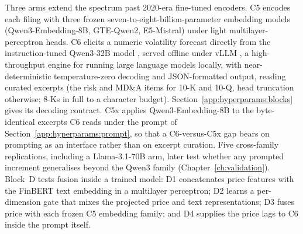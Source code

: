 Three arms extend the spectrum past 2020-era fine-tuned encoders. C5 encodes each filing with three frozen seven-to-eight-billion-parameter embedding models (Qwen3-Embedding-8B, GTE-Qwen2, E5-Mistral) under light multilayer-perceptron heads. %
C6 elicits a numeric volatility forecast directly from the instruction-tuned Qwen3-32B model \cite{qwen3_2025}, served offline under vLLM \cite{kwon2023vllm}, a high-throughput engine for running large language models locally, with near-deterministic temperature-zero decoding and JSON-formatted output, reading curated excerpts (the risk and MD\&A items for 10-K and 10-Q, head truncation otherwise; 8-Ks in full to a character budget). Section~\ref{app:hyperparams:blocks} gives its decoding contract. %
C5x applies Qwen3-Embedding-8B to the byte-identical excerpts C6 reads under the prompt of Section~\ref{app:hyperparams:prompt}, so that a C6-versus-C5x gap bears on prompting as an interface rather than on excerpt curation. Five cross-family replications, including a Llama-3.1-70B arm, later test whether any prompted increment generalises beyond the Qwen3 family (Chapter~\ref{ch:validation}). %
Block~D tests fusion inside a trained model: D1 concatenates price features with the FinBERT text embedding in a multilayer perceptron; D2 learns a per-dimension gate that mixes the projected price and text representations; D3 fuses price with each frozen C5 embedding family; and D4 supplies the price lags to C6 inside the prompt itself. %

